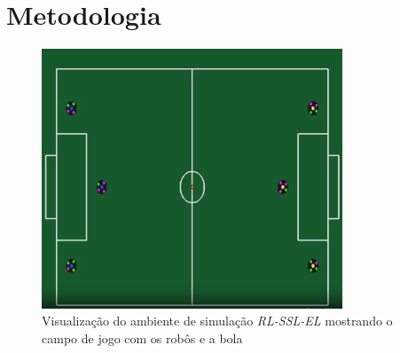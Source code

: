 \chapter{Metodologia}
\label{cap:metodologia}




\begin{figure}[h]
    \centering
    \includegraphics[width=0.8\textwidth]{fig/campo}
    \caption{Visualização do ambiente de simulação \textit{RL-SSL-EL} mostrando o campo de jogo com os robôs e a bola}
    \label{fig:campo_simulacao}
\end{figure}


